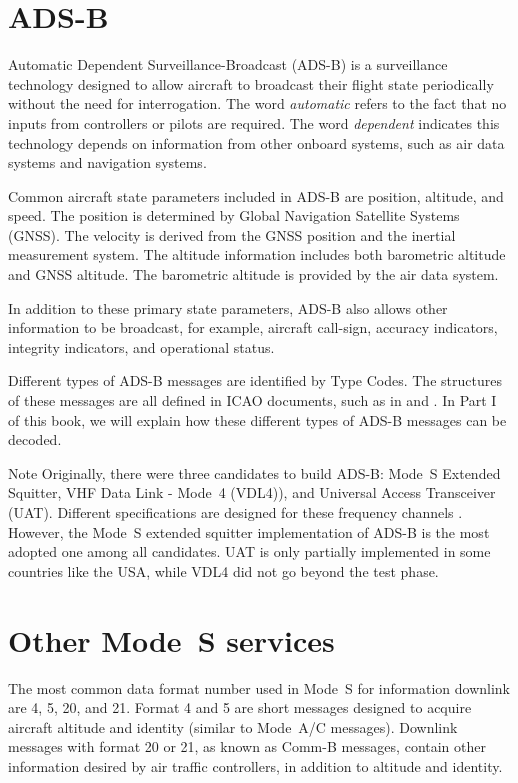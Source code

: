 \section{ADS-B}

Automatic Dependent Surveillance-Broadcast (ADS-B) is a surveillance technology designed to allow aircraft to broadcast their flight state periodically without the need for interrogation. The word \emph{automatic} refers to the fact that no inputs from controllers or pilots are required. The word \emph{dependent} indicates this technology depends on information from other onboard systems, such as air data systems and navigation systems.

Common aircraft state parameters included in ADS-B are position, altitude, and speed. The position is determined by Global Navigation Satellite Systems (GNSS). The velocity is derived from the GNSS position and the inertial measurement system. The altitude information includes both barometric altitude and GNSS altitude. The barometric altitude is provided by the air data system. 

In addition to these primary state parameters, ADS-B also allows other information to be broadcast, for example, aircraft call-sign, accuracy indicators, integrity indicators, and operational status.

Different types of ADS-B messages are identified by Type Codes. The structures of these messages are all defined in ICAO documents, such as in \cite{icao9871v1} and \cite{rtca2011mops}. In Part I of this book, we will explain how these different types of ADS-B messages can be decoded.

\begin{notebox}{Note}
Originally, there were three candidates to build ADS-B: Mode~S Extended Squitter, VHF Data Link - Mode~4 (VDL4)), and Universal Access Transceiver (UAT). Different specifications are designed for these frequency channels \cite{rtca2011mops, rtca2002uat}. However, the Mode~S extended squitter implementation of ADS-B is the most adopted one among all candidates. UAT is only partially implemented in some countries like the USA, while VDL4 did not go beyond the test phase.
\end{notebox}


\section{Other Mode~S services}

The most common data format number used in Mode~S for information downlink are 4, 5, 20, and 21. Format 4 and 5 are short messages designed to acquire aircraft altitude and identity (similar to Mode~A/C messages). Downlink messages with format 20 or 21, as known as Comm-B messages, contain other information desired by air traffic controllers, in addition to altitude and identity.

